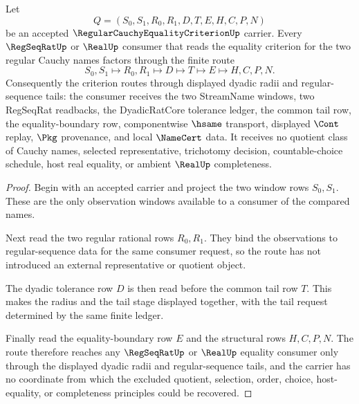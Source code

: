 \begin{theorem}
\label{thm:regular-cauchy-equality-criterion-dyadic-tail-route}
Let
$$
Q=(S_0,S_1,R_0,R_1,D,T,E,H,C,P,N)
$$
be an accepted $\RegularCauchyEqualityCriterionUp$ carrier. Every $\RegSeqRatUp$ or $\RealUp$ consumer that reads the equality criterion for the two regular Cauchy names factors through the finite route
$$
S_0,S_1 \longmapsto R_0,R_1 \longmapsto D \longmapsto T \longmapsto E \longmapsto H,C,P,N .
$$
Consequently the criterion routes through displayed dyadic radii and regular-sequence tails: the consumer receives the two StreamName windows, two RegSeqRat readbacks, the DyadicRatCore tolerance ledger, the common tail row, the equality-boundary row, componentwise $\hsame$ transport, displayed $\Cont$ replay, $\Pkg$ provenance, and local $\NameCert$ data. It receives no quotient class of Cauchy names, selected representative, trichotomy decision, countable-choice schedule, host real equality, or ambient $\RealUp$ completeness.
\end{theorem}
\begin{proof}
Begin with an accepted carrier and project the two window rows $S_0,S_1$. These are the only observation windows available to a consumer of the compared names.

Next read the two regular rational rows $R_0,R_1$. They bind the observations to regular-sequence data for the same consumer request, so the route has not introduced an external representative or quotient object.

The dyadic tolerance row $D$ is then read before the common tail row $T$. This makes the radius and the tail stage displayed together, with the tail request determined by the same finite ledger.

Finally read the equality-boundary row $E$ and the structural rows $H,C,P,N$. The route therefore reaches any $\RegSeqRatUp$ or $\RealUp$ equality consumer only through the displayed dyadic radii and regular-sequence tails, and the carrier has no coordinate from which the excluded quotient, selection, order, choice, host-equality, or completeness principles could be recovered.
\end{proof}


